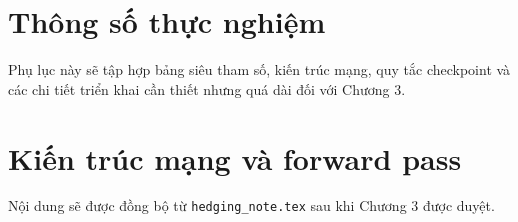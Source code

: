 \section*{Thông số thực nghiệm}

Phụ lục này sẽ tập hợp bảng siêu tham số, kiến trúc mạng, quy tắc checkpoint và các chi tiết triển khai cần thiết nhưng quá dài đối với Chương 3.

\section*{Kiến trúc mạng và forward pass}

Nội dung sẽ được đồng bộ từ \texttt{hedging\_note.tex} sau khi Chương 3 được duyệt.
